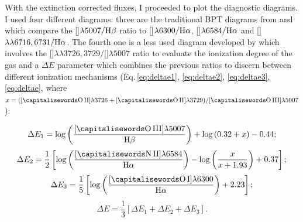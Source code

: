 \documentclass[../main.tex]{subfiles}
\begin{document}
With the extinction corrected fluxes, I proceeded to plot the diagnostic diagrams.
I used four different diagrams: three are the traditional BPT diagrams from \citet{Baldwin81} and \citet{Veilleux87} which compare the []$\lambda5007/\rm H\beta$ ratio to []$\lambda6300/\rm H\alpha$, []$\lambda6584/\rm H\alpha$ and []$\lambda\lambda6716,6731/\rm H\alpha$.
The fourth one is a less used diagram developed by \citet{Baldwin81} which involves the []$\lambda\lambda3726,3729/$[]$\lambda5007$ ratio to evaluate the ionization degree of the gas and a $\Delta E$ parameter which combines the previous ratios to discern between different ionization mechanisms (Eq.\,\ref{eq:deltae1}, \ref{eq:deltae2}, \ref{eq:deltae3}, \ref{eq:deltae}, where $x=([\rm \ion{O}{II}]\lambda3726+[\rm \ion{O}{II}]\lambda3729)/[\rm \ion{O}{III}]\lambda5007$):


\begin{equation}
\label{eq:deltae1}
\Delta E_1=\log\left(\frac{\rm[\ion{O}{III}]\lambda5007}{\rm \Hb}\right)+\log\left(0.32+x\right)-0.44;
\end{equation}
\begin{equation}
\label{eq:deltae2}
\Delta E_2= \frac{1}{2}\left[\log\left(\frac{\rm[\ion{N}{II}]\lambda6584}{\rm \Ha}\right)-\log\left(\frac{x}{x+1.93}\right) + 0.37\right];
\end{equation}
\begin{equation}
\label{eq:deltae3}
\Delta E_3=\frac{1}{5}\left[\log\left(\frac{\rm  [\ion{O}{I}]\lambda6300}{\rm \Ha}\right)+2.23\right];
\end{equation}
\begin{equation}
\label{eq:deltae}
\Delta E=\frac{1}{3}\left[\Delta E_1+\Delta E_2+\Delta E_3 \right].
\end{equation}
\end{document}
